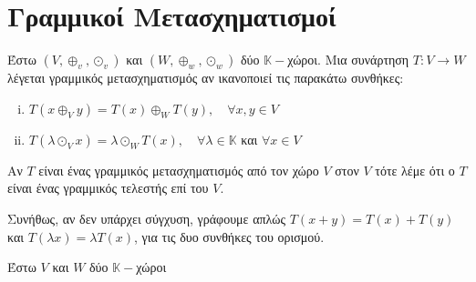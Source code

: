 








\chapter{Γραμμικοί Μετασχηματισμοί}

\begin{dfn}
    Έστω $ (V, \oplus _{v}, \odot _{v}) $ και $ (W, \oplus _{w}, \odot _{w}) $ 
    δύο $ \mathbb{K} - $χώροι. Μια συνάρτηση $ T \colon V \to W $ λέγεται 
    \textcolor{Col1}{γραμμικός μετασχηματισμός} αν ικανοποιεί τις παρακάτω συνθήκες:
    \begin{enumerate}[i)]
        \item $ T(x \oplus _{V} y) = T(x) \oplus _{W} T(y), \quad \forall x,y \in V $
        \item $ T(\lambda \odot _{V} x) = \lambda \odot _{W} T(x), \quad \forall \lambda 
            \in \mathbb{K} $ και $ \forall x \in V $
    \end{enumerate}
    Αν $T$ είναι ένας γραμμικός μετασχηματισμός από τον χώρο $V$ στον $V$ τότε λέμε 
    ότι ο $T$ είναι ένας \textcolor{Col1}{γραμμικός τελεστής} επί του $V$. 
\end{dfn}

\begin{rem}
    Συνήθως, αν δεν υπάρχει σύγχυση, γράφουμε απλώς $ T(x+y) = T(x) + T(y) $ και 
    $ T(\lambda x) = \lambda T(x) $, για τις δυο συνθήκες του ορισμού.
\end{rem}

\begin{rem}
    Έστω $ V $ και $W$ δύο $ \mathbb{K}- $χώροι 
\end{rem}


